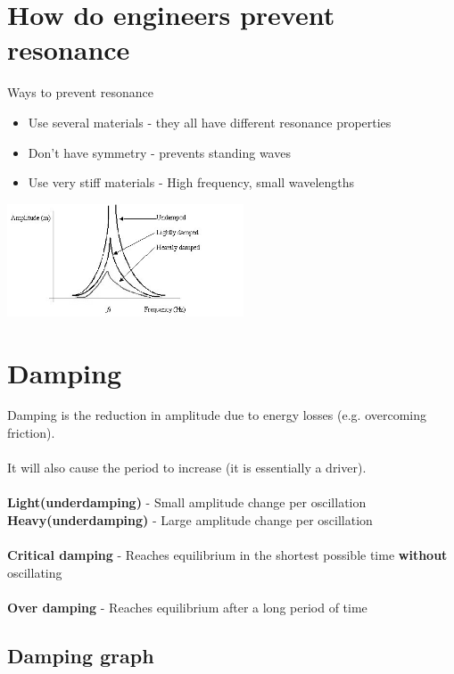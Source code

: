 \documentclass{article}[18pt]
\begin{document}
\section{How do engineers prevent resonance}
Ways to prevent resonance
\begin{itemize}
\item Use several materials - they all have different resonance properties
\item Don't have symmetry - prevents standing waves
\item Use very stiff materials - High frequency, small wavelengths
\end{itemize}


\includegraphics[width=7cm] {damp_6.jpg}
\section{Damping}
Damping is the reduction in amplitude due to energy losses (e.g. overcoming friction).\\
\\
It will also cause the period to increase (it is essentially a driver).\\
\\
\textbf{Light(underdamping)} - Small amplitude change per oscillation\\
\textbf{Heavy(underdamping)} - Large amplitude change per oscillation\\
\\
\textbf{Critical damping} - Reaches equilibrium in the shortest possible time \textbf{without} oscillating\\
\\
\textbf{Over damping} - Reaches equilibrium after a long period of time
\subsection{Damping graph}
\end{document}
